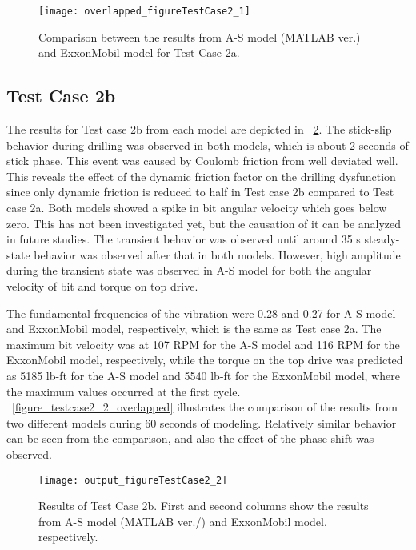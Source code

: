 \begin{figure}
  \centering
  \texttt{[image: overlapped\_figureTestCase2\_1]}
  \caption[Comparison of the results for Test Case 2a]{Comparison between the results from A-S model (MATLAB ver.) and ExxonMobil model for Test Case 2a.}\label{figure_testcase2_1_overlapped}
\end{figure}


\subsection{Test Case 2b}
The results for Test case 2b from each model are depicted in \figurename~\ref{figure_testcase2_2}. The stick-slip behavior during drilling was observed in both models, which is about 2 seconds of stick phase. This event was caused by Coulomb friction from well deviated well. This reveals the effect of the dynamic friction factor on the drilling dysfunction since only dynamic friction is reduced to half in Test case 2b compared to Test case 2a. Both models showed a spike in bit angular velocity which goes below zero. This has not been investigated yet, but the causation of it can be analyzed in future studies. The transient behavior was observed until around 35 s steady-state behavior was observed after that in both models. However, high amplitude during the transient state was observed in A-S model for both the angular velocity of bit and torque on top drive. 

The fundamental frequencies of the vibration were 0.28 and 0.27 for A-S model and ExxonMobil model, respectively, which is the same as Test case 2a. The maximum bit velocity was at 107 RPM for the A-S model and 116 RPM for the ExxonMobil model, respectively, while the torque on the top drive was predicted as 5185 lb-ft for the A-S model and 5540 lb-ft for the ExxonMobil model, where the maximum values occurred at the first cycle. \figurename~\ref{figure_testcase2_2_overlapped} illustrates the comparison of the results from two different models during 60 seconds of modeling. Relatively similar behavior can be seen from the comparison, and also the effect of the phase shift was observed.

\begin{figure}
  \centering
  \texttt{[image: output\_figureTestCase2\_2]}
  \caption[Results of Test Case 2b]{Results of Test Case 2b. First and second columns show the results from A-S model (MATLAB ver./) and ExxonMobil model, respectively.}\label{figure_testcase2_2}
\end{figure}


